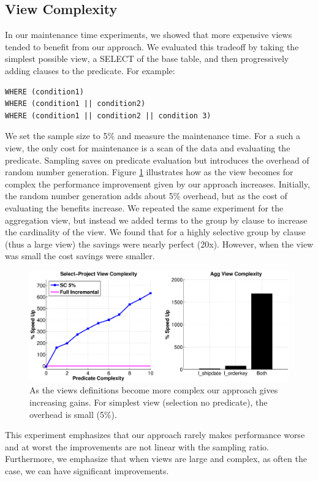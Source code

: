 \subsection{View Complexity}
In our maintenance time experiments, we showed that more expensive views tended to benefit from our approach.
We evaluated this tradeoff by taking the simplest possible view, a SELECT of the base table, and then progressively adding clauses to the predicate.
For example:
\begin{lstlisting}
WHERE (condition1)
WHERE (condition1 || condition2)
WHERE (condition1 || condition2 || condition 3)
\end{lstlisting}
We set the sample size to 5\% and measure the maintenance time.
For a such a view, the only cost for maintenance is a scan of the data and evaluating the predicate. 
Sampling saves on predicate evaluation but introduces the overhead of random number generation.
Figure \ref{exp11overheads} illustrates how as the view becomes for complex the performance improvement given
by our approach increases.
Initially, the random number generation adds about 5\% overhead, but as the cost of evaluating the benefits increase.
We repeated the same experiment for the aggregation view, but instead we added terms to the group by clause to increase the
cardinality of the view.
We found that for a highly selective group by clause (thus a large view) the savings were nearly perfect (20x).
However, when the view was small the cost savings were smaller.
\begin{figure}[h]
\label{exp11overheads}
\hspace{-2.5em}
 \includegraphics[scale=0.25]{exp/complexity_efficiency_tradeoff.eps}
 \caption{As the views definitions become more complex our approach gives increasing gains. For simplest view (selection no predicate), the overhead is small (5\%). }
\end{figure}
This experiment emphasizes that our approach rarely makes performance worse and at worst the improvements are not linear with the sampling ratio.
Furthermore, we emphasize that when views are large and complex, as often the case, we can have significant improvements.

